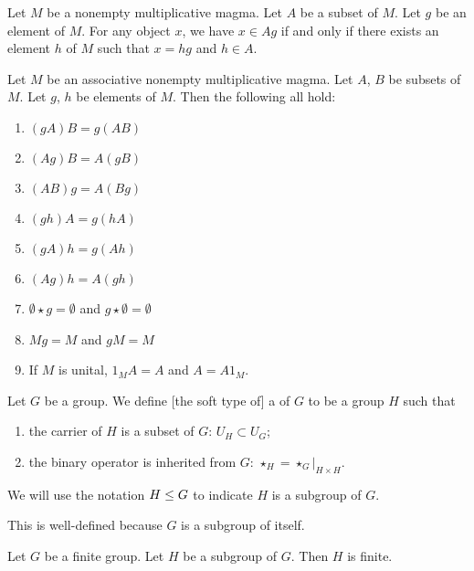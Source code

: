 \begin{theorem}
Let $M$ be a nonempty multiplicative magma.
Let $A$ be a subset of $M$.
Let $g$ be an element of $M$.
For any object $x$, we have $x\in Ag$ if and only if there exists an
element $h$ of $M$ such that $x=hg$ and $h\in A$.
\end{theorem}

\begin{theorem}
Let $M$ be an associative nonempty multiplicative magma.
Let $A$, $B$ be subsets of $M$.
Let $g$, $h$ be elements of $M$. Then the following all hold:
\begin{enumerate}
\item $(gA)B=g(AB)$
\item $(Ag)B=A(gB)$
\item $(AB)g=A(Bg)$
\item $(gh)A=g(hA)$
\item $(gA)h=g(Ah)$
\item $(Ag)h=A(gh)$
\item $\emptyset\star g=\emptyset$ and $g\star\emptyset=\emptyset$
\item $Mg=M$ and $gM=M$
\item If $M$ is unital, $1_{M}A=A$ and $A=A1_{M}$.
\end{enumerate}
\end{theorem}

\begin{definition}[Subgroup]
Let $G$ be a group. We define [the soft type of] a 
of $G$ to be a group $H$ such that
\begin{enumerate}
\item the carrier of $H$ is a subset of $G$: $U_{H}\subset U_{G}$;
\item the binary operator is inherited from $G$:
  $\star_{H}=\star_{G}|_{H\times H}$.
\end{enumerate}
We will use the notation $H\leq G$ to indicate $H$ is a subgroup
of $G$.

This is well-defined because $G$ is a subgroup of itself.
\end{definition}

\begin{theorem}
Let $G$ be a finite group. Let $H$ be a subgroup of $G$.
Then $H$ is finite.
\end{theorem}

